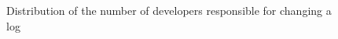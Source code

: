 \begin{figure}[tb]
	
	\centering
	\hfill
	\caption{Distribution of the number of developers responsible for changing a log}
	\label{fig:NumberofDevelopers}
\end{figure}

